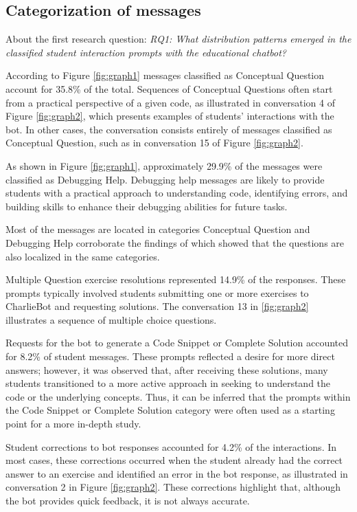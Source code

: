 \documentclass[a4paper,twoside]{article}
\begin{document}
\subsection{Categorization of messages}

About the first research question: \textit{RQ1: What distribution patterns
emerged in the classified student interaction prompts with the educational
chatbot?}

According to Figure \ref{fig:graph1} messages classified as
Conceptual Question account for 35.8\% of the total. Sequences of Conceptual
Questions often start from a practical perspective of a given code, as
illustrated in conversation 4 of Figure \ref{fig:graph2}, which presents
examples of students' interactions with the bot. In other cases, the
conversation consists entirely of messages classified as Conceptual Question,
such as in conversation 15 of Figure \ref{fig:graph2}.

As shown in Figure \ref{fig:graph1}, approximately 29.9\% of the messages were
classified as Debugging Help. Debugging help messages are likely to provide
students with a practical approach to understanding code, identifying errors,
and building skills to enhance their debugging abilities for future tasks.

Most of the messages are located in categories Conceptual Question and Debugging
Help corroborate the findings of \cite{Ghimire24} which showed that the
questions are also localized in the same categories.

Multiple Question exercise resolutions represented 14.9\% of the responses.
These prompts typically involved students submitting one or more exercises to
CharlieBot and requesting solutions. The conversation 13 in \ref{fig:graph2}
illustrates a sequence of multiple choice questions.

Requests for the bot to generate a Code Snippet or Complete Solution accounted
for 8.2\% of student messages. These prompts reflected a desire for more
direct answers; however, it was observed that, after receiving these solutions,
many students transitioned to a more active approach in seeking to understand
the code or the underlying concepts. Thus, it can be inferred that the prompts
within the Code Snippet or Complete Solution category were often used as a
starting point for a more in-depth study.

Student corrections to bot responses accounted for 4.2\% of the interactions.
In most cases, these corrections occurred when the student already had the
correct answer to an exercise and identified an error in the bot response, as
illustrated in conversation 2 in Figure \ref{fig:graph2}. These corrections
highlight that, although the bot provides quick feedback, it is not always
accurate.
\end{document}
